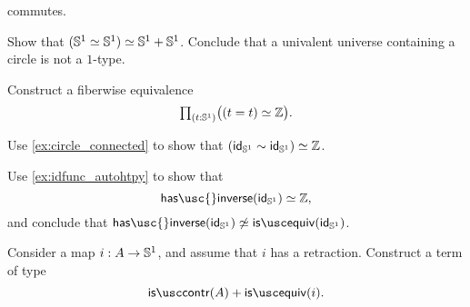 \begin{exercises}
\begin{subexenum}
commutes.
\end{subexenum}
\item Show that $\eqv{(\eqv{\sphere{1}}{\sphere{1}})}{\sphere{1}+\sphere{1}}$. Conclude that a univalent universe containing a circle is not a $1$-type.
\item \label{ex:is_invertible_id_S1}
\begin{subexenum}
\item Construct a fiberwise equivalence
\begin{equation*}
\prd{t:\sphere{1}} \big(\eqv{(t=t)}{\Z}\big).
\end{equation*}
\item Use \cref{ex:circle_connected} to show that $\eqv{(\idfunc[\sphere{1}]\htpy\idfunc[\sphere{1}])}{\Z}$.
\item Use \cref{ex:idfunc_autohtpy} to show that
\begin{equation*}
\eqv{\mathsf{has\usc{}inverse}(\idfunc[\sphere{1}])}{\Z},
\end{equation*}
and conclude that ${\mathsf{has\usc{}inverse}}(\idfunc[\sphere{1}])\not\simeq{\isequiv(\idfunc[\sphere{1}])}$. 
\end{subexenum}
\item Consider a map $i:A \to \mathbb{S}^{1}$, and assume that $i$ has a retraction. Construct a term of type
  \begin{equation*}
    \iscontr(A)+\isequiv(i).
  \end{equation*}
\end{exercises}
